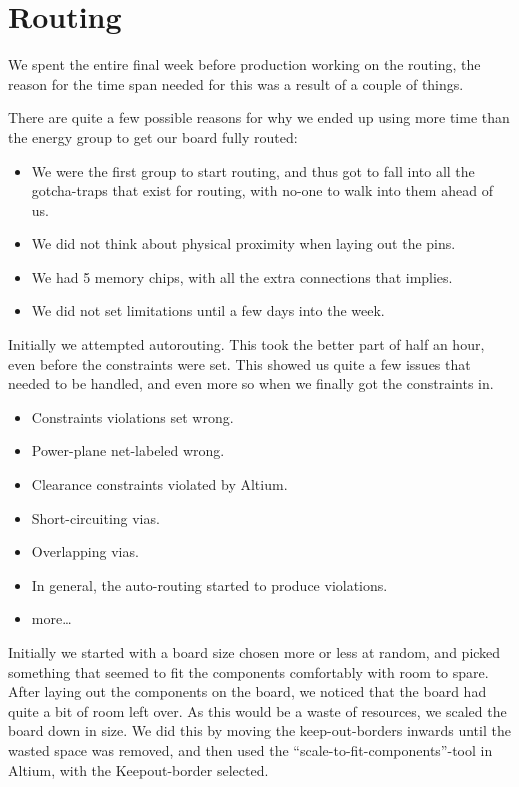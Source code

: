 \section {Routing}

We spent the entire final week before production working on the routing,
the reason for the time span needed for this was a result of a couple of
things.

There are quite a few possible reasons for why we ended up using more time than
the energy group to get our board fully routed:
\begin {itemize}
\item We were the first group to start routing, and thus got to fall into all
  the gotcha-traps that exist for routing, with no-one to walk into them ahead
  of us.
\item We did not think about physical proximity when laying out the pins.
\item We had 5 memory chips, with all the extra connections that implies.
\item We did not set limitations until a few days into the week.
\end {itemize}

Initially we attempted autorouting. This took the better part of half an hour,
even before the constraints were set. This showed us quite a few issues that
needed to be handled, and even more so when we finally got the constraints in.

\begin{itemize}
\item Constraints violations set wrong.
\item Power-plane net-labeled wrong.
\item Clearance constraints violated by Altium.
\item Short-circuiting vias.
\item Overlapping vias.
\item In general, the auto-routing started to produce violations.
\item more\ldots
\end{itemize}

Initially we started with a board size chosen more or less at random, and picked
something that seemed to fit the components comfortably with room to spare.
After laying out the components on the board, we noticed that the board had
quite a bit of room left over. As this would be a waste of resources, we scaled
the board down in size. We did this by moving the keep-out-borders inwards until
the wasted space was removed, and then used the ``scale-to-fit-components''-tool
in Altium, with the Keepout-border selected.


